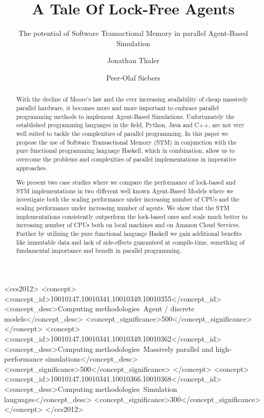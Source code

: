 \documentclass[format=acmsmall, review=true, screen=true]{acmart}
\begin{document}

\title[A Tale Of Lock-Free Agents]{A Tale Of Lock-Free Agents}
\subtitle{The potential of Software Transactional Memory in parallel Agent-Based Simulation}

\author{Jonathan Thaler}
\author{Peer-Olaf Siebers}

\begin{abstract}
With the decline of Moore's law and the ever increasing availability of cheap massively parallel hardware, it becomes more and more important to embrace parallel programming methods to implement Agent-Based Simulations. Unfortunately the established programming languages in the field, Python, Java and C++, are not very well suited to tackle the complexities of parallel programming. In this paper we propose the use of Software Transactional Memory (STM) in conjunction with the pure functional programming language Haskell, which in combination, allow us to overcome the problems and complexities of parallel implementations in imperative approaches.

We present two case studies where we compare the performance of lock-based and STM implementations in two different well known Agent-Based Models where we investigate both the scaling performance under increasing number of CPUs and the scaling performance under increasing number of agents. We show that the STM implementations consistently outperform the lock-based ones and scale much better to increasing number of CPUs both on local machines and on Amazon Cloud Services. Further by utilizing the pure functional language Haskell we gain additional benefits like immutable data and lack of side-effects guaranteed at compile-time, something of fundamental importance and benefit in parallel programming.
\end{abstract}

%
%
\begin{CCSXML}
<ccs2012>
<concept>
<concept_id>10010147.10010341.10010349.10010355</concept_id>
<concept_desc>Computing methodologies~Agent / discrete models</concept_desc>
<concept_significance>500</concept_significance>
</concept>
<concept>
<concept_id>10010147.10010341.10010349.10010362</concept_id>
<concept_desc>Computing methodologies~Massively parallel and high-performance simulations</concept_desc>
<concept_significance>500</concept_significance>
</concept>
<concept>
<concept_id>10010147.10010341.10010366.10010368</concept_id>
<concept_desc>Computing methodologies~Simulation languages</concept_desc>
<concept_significance>300</concept_significance>
</concept>
</ccs2012>
\end{CCSXML}
\end{document}
